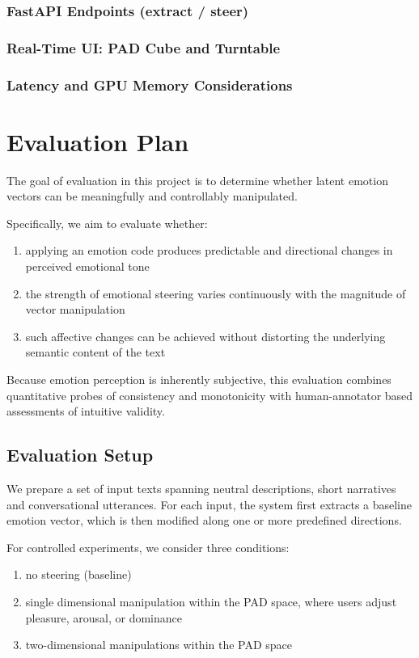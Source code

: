 \documentclass[12pt,twoside]{report}
\begin{document}
  \subsection{FastAPI Endpoints (extract / steer)}
  \subsection{Real-Time UI: PAD Cube and Turntable}%
  \subsection{Latency and GPU Memory Considerations}

\chapter{Evaluation Plan}

The goal of evaluation in this project is to determine whether latent emotion vectors can be meaningfully and controllably manipulated.

Specifically, we aim to evaluate whether:

\begin{enumerate}
    \item applying an emotion code produces predictable and directional changes in perceived emotional tone
    \item the strength of emotional steering varies continuously with the magnitude of vector manipulation
    \item such affective changes can be achieved without distorting the underlying semantic content of the text
\end{enumerate}

Because emotion perception is inherently subjective, this evaluation combines quantitative probes of consistency and monotonicity with human-annotator based assessments of intuitive validity.

\section{Evaluation Setup}

We prepare a set of input texts spanning neutral descriptions, short narratives and conversational utterances. For each input, the system first extracts a baseline emotion vector, which is then modified along one or more predefined directions.

For controlled experiments, we consider three conditions:
\begin{enumerate}
    \item no steering (baseline)
    \item single dimensional manipulation within the PAD space, where users adjust pleasure, arousal, or dominance
    \item two-dimensional manipulations within the PAD space
\end{enumerate}
\end{document}

